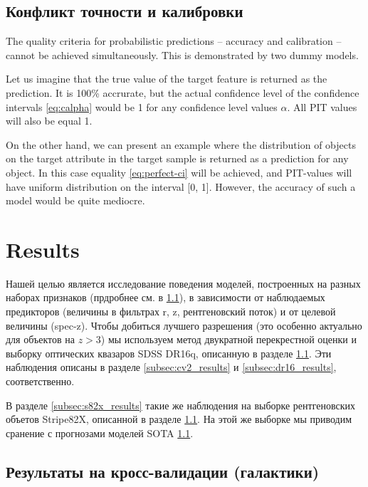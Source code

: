 \documentclass[fleqn,usenatbib]{mnras}
\begin{document}
\subsection{Конфликт точности и калибровки}\label{sec:quality-conflict}
The quality criteria for probabilistic predictions -- accuracy and calibration -- cannot be achieved simultaneously. This is demonstrated by two dummy models.

Let us imagine that the true value of the target feature is returned as the prediction. It is 100\% accrurate, but the actual confidence level of the confidence intervals \eqref{eq:calpha} would be 1 for any confidence level values $\alpha$. All PIT values will also be equal 1.

On the other hand, we can present an example where the distribution of objects on the target attribute in the target sample is returned as a prediction for any object. In this case equality \eqref{eq:perfect-ci} will be achieved, and PIT-values will have uniform distribution on the interval [0, 1]. However, the accuracy of such a model would be quite mediocre.


\section{Results}

Нашей целью является исследование поведения моделей, построенных на разных наборах признаков (прдробнее см. в \ref{}), в зависимости от наблюдаемых предикторов (величины в фильтрах r, z, рентгеновский поток) и от целевой величины (spec-z). Чтобы добиться лучшего разрешения (это особенно актуально для объектов на $z > 3$) мы используем метод двукратной перекрестной оценки и выборку оптических квазаров SDSS DR16q, описанную в разделе \ref{}. Эти наблюдения описаны в разделе \ref{subsec:cv2_results} и \ref{subsec:dr16_results}, соответственно.

В разделе \ref{subsec:s82x_results} такие же наблюдения на выборке рентгеновских объетов Stripe82X, описанной в разделе \ref{}. На этой же выборке мы приводим сранение с прогнозами моделей SOTA \ref{}.

\subsection{Результаты на кросс-валидации (галактики)}
\end{document}
